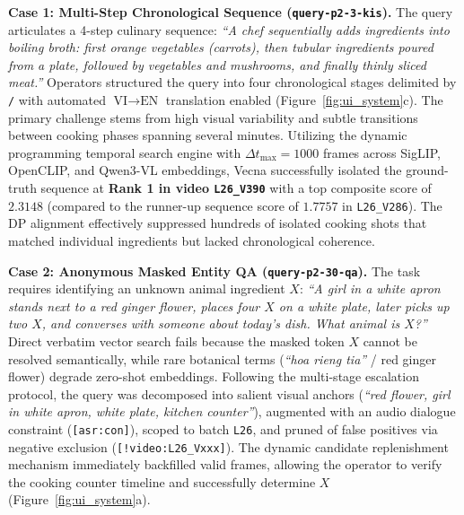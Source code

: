 \textbf{Case 1: Multi-Step Chronological Sequence (\texttt{query-p2-3-kis}).} The query articulates a 4-step culinary sequence: \textit{``A chef sequentially adds ingredients into boiling broth: first orange vegetables (carrots), then tubular ingredients poured from a plate, followed by vegetables and mushrooms, and finally thinly sliced meat.''} Operators structured the query into four chronological stages delimited by \texttt{/} with automated $\text{VI} \rightarrow \text{EN}$ translation enabled (Figure~\ref{fig:ui_system}c). The primary challenge stems from high visual variability and subtle transitions between cooking phases spanning several minutes. Utilizing the dynamic programming temporal search engine with $\Delta t_{\max} = 1000$ frames across SigLIP, OpenCLIP, and Qwen3-VL embeddings, Vecna successfully isolated the ground-truth sequence at \textbf{Rank 1 in video \texttt{L26\_V390}} with a top composite score of $2.3148$ (compared to the runner-up sequence score of $1.7757$ in \texttt{L26\_V286}). The DP alignment effectively suppressed hundreds of isolated cooking shots that matched individual ingredients but lacked chronological coherence.

\textbf{Case 2: Anonymous Masked Entity QA (\texttt{query-p2-30-qa}).} The task requires identifying an unknown animal ingredient $X$: \textit{``A girl in a white apron stands next to a red ginger flower, places four $X$ on a white plate, later picks up two $X$, and converses with someone about today's dish. What animal is $X$?''} Direct verbatim vector search fails because the masked token $X$ cannot be resolved semantically, while rare botanical terms (\textit{``hoa rieng tia''} / red ginger flower) degrade zero-shot embeddings. Following the multi-stage escalation protocol, the query was decomposed into salient visual anchors (\textit{``red flower, girl in white apron, white plate, kitchen counter''}), augmented with an audio dialogue constraint (\texttt{[asr:con]}), scoped to batch \texttt{L26}, and pruned of false positives via negative exclusion (\texttt{[!video:L26\_Vxxx]}). The dynamic candidate replenishment mechanism immediately backfilled valid frames, allowing the operator to verify the cooking counter timeline and successfully determine $X$ (Figure~\ref{fig:ui_system}a).
